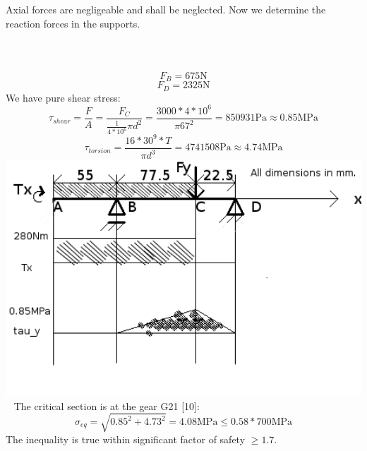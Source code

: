 \documentclass{article}
\begin{document}
Axial forces are negligeable and shall be neglected.
Now we determine the reaction forces in the supports. \\
 \\[0.1cm]
 \\[0.1cm]
 \\[0.1cm]
$$ F_B = 675 \si{\newton} $$
$$ F_D = 2325 \si{\newton} $$
We have pure shear stress:
$$ \tau_{shear} = \frac{F}{A} = \frac{F_C}{\frac{1}{4*10^6}\pi d^2} = \frac{3000 * 4 * 10^6}{\pi 67^2} = 850931 \si{\pascal} \approx 0.85\si{\mega\pascal}$$
$$ \tau_{torsion} = \frac{16*30^9*T}{\pi d^3} = 4741508 \si{\pascal} \approx 4.74 \si{\mega\pascal}$$
\includegraphics[width=1.25\textwidth]{images/fbd}~
The critical section is at the gear G21 [10]:
$$ \sigma_{eq} = \sqrt{0.85^2 + 4.73^2} = 4.08 \si{\mega\pascal} \leq 0.58 * 700\si{\mega\pascal}  $$
The inequality is true within significant factor of safety $\geq 1.7$.

\end{document}
